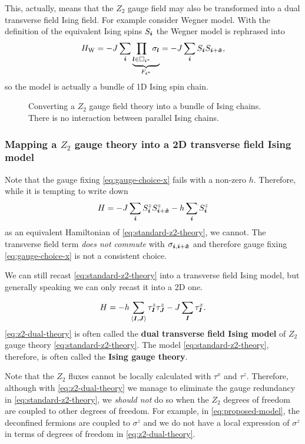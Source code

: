 \documentclass[hyperref, a4paper]{article}
\newcommand*{\pair}[1]{\langle #1 \rangle}
\newcommand*{\concept}[1]{{\textbf{#1}}}
\newcommand*{\Ztwo}{\texorpdfstring{$\mathbb{Z}_2$ }{Z2 }}
\newcommand*{\tfim}{transverse field Ising model}
\def\mathbb#1{#1}%
\begin{document}
This, actually, means that the \Ztwo gauge field may also be transformed into a dual transverse field Ising field.
For example consider Wegner model.
With the definition of the equivalent Ising spins $S_{\vb*{i}}$ the Wegner model is rephrased into
\begin{equation}
    H_\text{W} = - J \sum_{\vb*{i}} \underbrace{\prod_{\vb*{l} \in \Box_{\vb*{i}^*}} \sigma_{\vb*{l}}}_{F_{\vb*{i}^*}} = -J \sum_{\vb*{i}} S_{\vb*{i}} S_{\vb*{i}+\vu*{x}},
\end{equation}
so the model is actually a bundle of 1D Ising spin chain.

\begin{figure}
    \centering
    
    \caption{Converting a \Ztwo gauge field theory into a bundle of Ising chains. There is no interaction between parallel Ising chains.}
\end{figure}

\subsubsection{Mapping a \Ztwo gauge theory into a 2D \tfim{}}

Note that the gauge fixing \eqref{eq:gauge-choice-x} fails with a non-zero $h$.
Therefore, while it is tempting to write down 
\begin{equation}
    H = - J \sum_{\vb*{i}} S_{\vb*{i}}^z S^z_{\vb*{i} + \vu*{x}} - h \sum_{\vb*{i}} {S}^z_{\vb*{i}}
\end{equation}
as an equivalent Hamiltonian of \eqref{eq:standard-z2-theory}, we cannot.
The transverse field term \emph{does not commute} with $\sigma_{\vb*{i}, \vb*{i} + \vu*{x}}$ and therefore 
gauge fixing \eqref{eq:gauge-choice-x} is not a consistent choice.

We can still recast \eqref{eq:standard-z2-theory} into a \tfim{}, but generally speaking we can only recast it into a 2D one.

\begin{equation}
    H = - h \sum_{\pair{\vb*{I}, \vb*{J}}} \tau^z_{\vb*{I}} \tau^z_{\vb*{J}} - J \sum_{\vb*{I}} \tau^x_{\vb*{I}}.
    \label{eq:z2-dual-theory}
\end{equation}
\eqref{eq:z2-dual-theory} is often called the \concept{dual \tfim{}} of \Ztwo gauge theory \eqref{eq:standard-z2-theory}.
The model \eqref{eq:standard-z2-theory}, therefore, is often called the \concept{Ising gauge theory}.

Note that the \Ztwo fluxes cannot be locally calculated with $\tau^x$ and $\tau^z$. 
Therefore, although with \eqref{eq:z2-dual-theory} we manage to eliminate the gauge redundancy in \eqref{eq:standard-z2-theory},
we \emph{should not} do so when the \Ztwo degrees of freedom are coupled to other degrees of freedom.
For example, in \eqref{eq:proposed-model}, the deconfined fermions are coupled to $\sigma^z$ and 
we do not have a local expression of $\sigma^z$ in terms of degrees of freedom in \eqref{eq:z2-dual-theory}.
\end{document}
